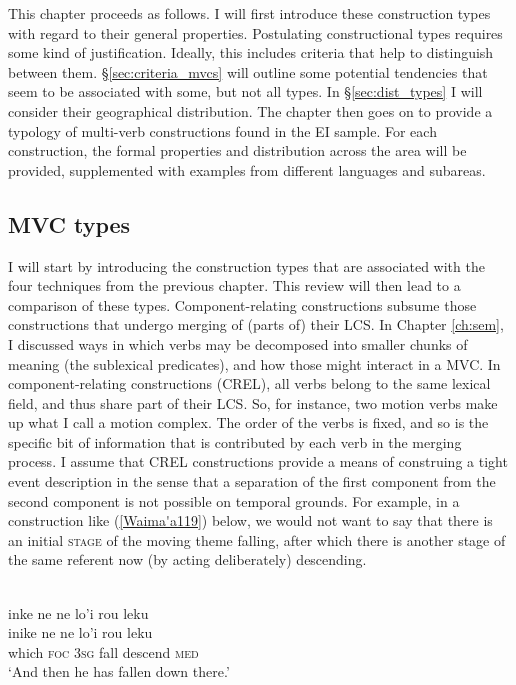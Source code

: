 This chapter proceeds as follows. I will first introduce these construction types with regard to their general properties. Postulating constructional types requires some kind of justification. Ideally, this includes criteria that help to distinguish between them. §\ref{sec:criteria_mvcs} will outline some potential tendencies that seem to be associated with some, but not all types. In §\ref{sec:dist_types} I will consider their geographical distribution. The chapter then goes on to provide a typology of multi-verb constructions found in the EI sample. For each construction, the formal properties and distribution across the area will be provided, supplemented with examples from different languages and subareas. 

\subsection{MVC types} \label{sec:mvc-types}

I will start by introducing the construction types that are associated with the four techniques from the previous chapter. This review will then lead to a comparison of these types. Component-relating constructions subsume those constructions that undergo merging of (parts of) their LCS. In Chapter \ref{ch:sem}, I  discussed ways in which verbs may be decomposed into smaller chunks of meaning (the sublexical predicates), and how those might interact in a MVC. In component-relating constructions (CREL), all verbs belong to the same lexical field, and thus share part of their LCS. So, for instance, two motion verbs make up what I call a motion complex. The order of the verbs is fixed, and so is the specific bit of information that is contributed by each verb in the merging process. I assume that CREL constructions provide a means of construing a tight event description in the sense that a separation of the first component from the second component is not possible on temporal grounds. For example, in a construction like (\ref{Waima'a119}) below, we would not want to say that there is an initial \textsc{stage} of the moving theme falling, after which there is another stage of the same referent now (by acting deliberately) descending. 

\ea \label{Waima'a119}
\\
\glll inke ne ne lo'i rou leku \\
inike ne ne lo'i rou leku \\
which \textsc{foc} \textsc{3}\textsc{sg} fall descend \textsc{med} \\
\glft `And then he has fallen down there.' \\ 
\z


